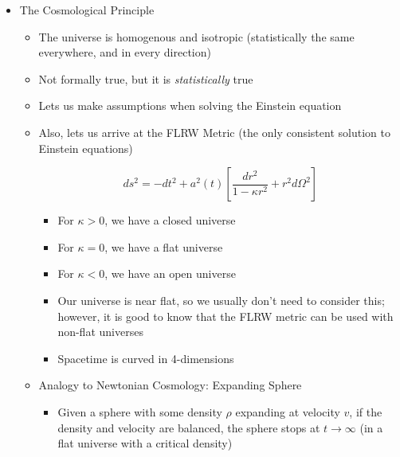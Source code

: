 \begin{itemize}

  \item The Cosmological Principle

    \begin{itemize}

      \item The universe is homogenous and isotropic (statistically the same everywhere, and in every direction)

      \item Not formally true, but it is \textit{statistically} true

      \item Lets us make assumptions when solving the Einstein equation

      \item Also, lets us arrive at the FLRW Metric (the only consistent solution to Einstein equations)

        $$ds^2=-dt^2+a^2(t)\left[ \frac{dr^2}{1-\kappa r^2}+r^2d\Omega^2 \right]$$

        \begin{itemize}

          \item For $\kappa>0$, we have a closed universe

          \item For $\kappa=0$, we have a flat universe

          \item For $\kappa<0$, we have an open universe

          \item Our universe is near flat, so we usually don't need to consider this; however, it is good to know that the FLRW metric can be used with non-flat universes

          \item Spacetime is curved in 4-dimensions

        \end{itemize}

      \item Analogy to Newtonian Cosmology: Expanding Sphere

        \begin{itemize}

          \item Given a sphere with some density $\rho$ expanding at velocity $v$, if the density and velocity are balanced, the sphere stops at $t\to\infty$ (in a flat universe with a critical density)


\end{itemize}
\end{itemize}
\end{itemize}
